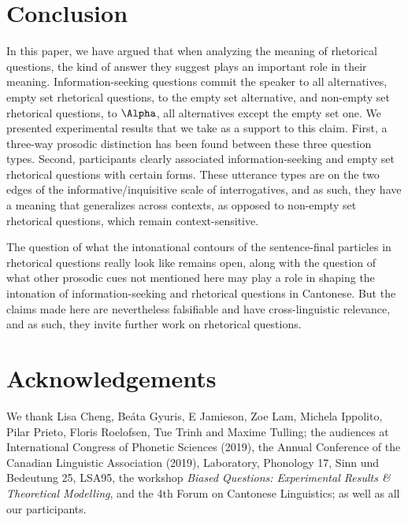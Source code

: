\documentclass[output=paper,colorlinks,citecolor=brown            ,chinesefont]{langscibook}
\begin{document}
\section{Conclusion}
\label{sec:conclusion}

In this paper, we have argued that when analyzing the meaning of rhetorical questions, the kind of answer they suggest plays an important role in their meaning. Information-seeking questions commit the speaker to all alternatives, empty set rhetorical questions, to the empty set alternative, and non-empty set rhetorical questions, to $\Alpha$, all alternatives except the empty set one. We presented experimental results that we take as a support to this claim. First, a three-way prosodic distinction has been found between these three question types. Second, participants clearly associated information-seeking and empty set rhetorical questions with certain forms. These utterance types are on the two edges of the informative/inquisitive scale of interrogatives, and as such, they have a meaning that generalizes across contexts, as opposed to non-empty set rhetorical questions, which remain context-sensitive.

The question of what the intonational contours of the sentence-final particles in rhetorical questions really look like remains open, along with the question of what other prosodic cues not mentioned here may play a role in shaping the intonation of information-seeking and rhetorical questions in Cantonese. But the claims made here are nevertheless falsifiable and have cross-linguistic relevance, and as such, they invite further work on rhetorical questions.

\section*{Acknowledgements}
We thank Lisa Cheng, Beáta Gyuris, E Jamieson, Zoe Lam, Michela Ippolito, Pilar Prieto, Floris Roelofsen, Tue Trinh and Maxime Tulling; the audiences at International Congress of Phonetic Sciences (2019), the Annual Conference of the Canadian Linguistic Association (2019), Laboratory, Phonology 17, Sinn und Bedeutung 25, LSA95, the workshop \textit{Biased Questions: Experimental Results \& Theoretical Modelling}, and the 4th Forum on Cantonese Linguistics; as well as all our participants.

\printbibliography[heading=subbibliography, notkeyword=this]
\end{document}

